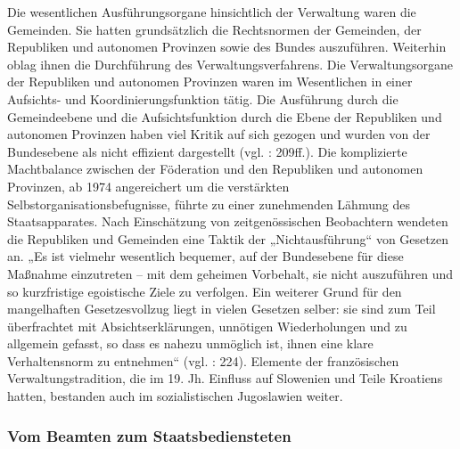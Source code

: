 Die wesentlichen Ausführungsorgane hinsichtlich der Verwaltung waren die Gemeinden. Sie hatten grundsätzlich die Rechtsnormen der Gemeinden, der Republiken und autonomen Provinzen sowie des Bundes auszuführen. Weiterhin oblag ihnen die Durchführung des Verwaltungsverfahrens. Die Verwaltungsorgane der Republiken und autonomen Provinzen waren im Wesentlichen in einer Aufsichts- und Koordinierungsfunktion tätig. Die Ausführung durch die Gemeindeebene und die Aufsichtsfunktion durch die Ebene der Republiken und autonomen Provinzen haben viel Kritik auf sich gezogen und wurden von der Bundesebene als nicht effizient dargestellt (vgl. \cite{beckm90} : 209ff.). Die komplizierte Machtbalance zwischen der Föderation und den Republiken und autonomen Provinzen, ab 1974 angereichert um die verstärkten Selbstorganisationsbefugnisse, führte zu einer zunehmenden Lähmung des Staatsapparates. Nach Einschätzung von zeitgenössischen Beobachtern wendeten die Republiken und Gemeinden eine Taktik der „Nichtausführung“ von Gesetzen an. „Es ist vielmehr wesentlich bequemer, auf der Bundesebene für diese Maßnahme einzutreten – mit dem geheimen Vorbehalt, sie nicht auszuführen und so kurzfristige egoistische Ziele zu verfolgen. Ein weiterer Grund für den mangelhaften Gesetzesvollzug liegt in vielen Gesetzen selber: sie sind zum Teil überfrachtet mit Absichtserklärungen, unnötigen Wiederholungen und zu allgemein gefasst, so dass es nahezu unmöglich ist, ihnen eine klare Verhaltensnorm zu entnehmen“ (vgl. \cite{beckm90} : 224). Elemente der französischen Verwaltungstradition, die im 19. Jh. Einfluss auf Slowenien und Teile Kroatiens hatten, bestanden auch im sozialistischen Jugoslawien weiter.

\subsubsection{Vom Beamten zum Staatsbediensteten}

